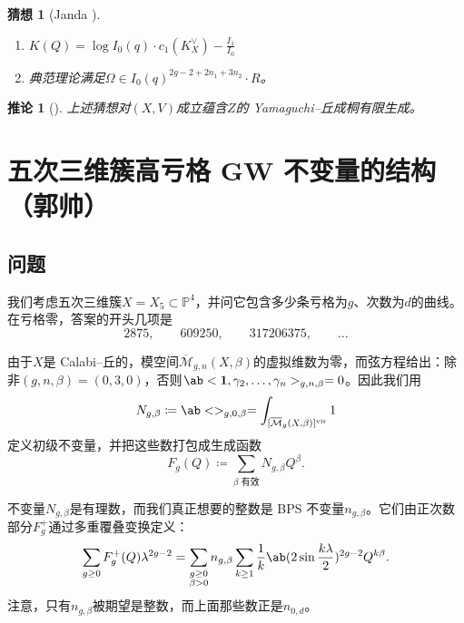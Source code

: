 \documentclass{amsart}
\newtheorem{cor}[thm]{推论}
\newtheorem{conj}[thm]{猜想}
\theoremstyle{definition}
\theoremstyle{remark}
\theoremstyle{plain}
\theoremstyle{definition}
\theoremstyle{remark}
\renewcommand{\P}{\mathbb{P}}
\newcommand{\Mbar}{\overline{\mathcal{M}}}
\newcommand{\mr}[1]{\mathrm{#1}}
\newcommand{\1}{\mathbf{1}}
\newcommand{\2}{\mathbf{2}}
\newcommand{\3}{\mathbf{3}}
\newcommand{\vir}{\mr{vir}}
\begin{document}
\begin{conj}[Janda {\cite[猜想~1.6]{CJRtropical2025}}]\leavevmode
    \begin{enumerate}
        \item \(K(Q) = \log I_0(q) \cdot c_1(K_X^{\vee}) - \frac{I_1}{I_0}\) \\
        \item 典范理论满足\(\Omega \in I_0(q)^{2g-2+2n_1 + 3 n_2} \cdot R\)。
    \end{enumerate}
\end{conj}

\begin{cor}[{\cite[定理~1.7]{CJRtropical2025}}]
    上述猜想对\((X, V)\)成立蕴含\(Z\)的 Yamaguchi--丘成桐有限生成。
\end{cor}


\section{五次三维簇高亏格 GW 不变量的结构（郭帅）}%
\label{sec:Structure of higher-genus GW invariants of the quintic (Shuai Guo)}

\subsection{问题}%
\label{sub:The problem (Guo)}

我们考虑五次三维簇\(X = X_5 \subset \P^4\)，并问它包含多少条亏格为\(g\)、次数为\(d\)的曲线。在亏格零，答案的开头几项是
\[ 2875, \qquad 609250, \qquad 317206375, \qquad \ldots \]

由于\(X\)是 Calabi--丘的，模空间\(\Mbar_{g,n}(X,\beta)\)的虚拟维数为零，而弦方程给出：除非\((g,n,\beta) = (0,3,0)\)，否则\(\ab<\1, \gamma_2, \ldots, \gamma_n>_{g,n,\beta} = 0\)。因此我们用
\[ N_{g,\beta} \coloneqq \ab<>_{g,0,\beta} = \int_{[\Mbar_g(X,\beta)]^{\vir}} 1 \]
定义初级不变量，并把这些数打包成生成函数
\[ F_g(Q) \coloneqq \sum_{\beta \text{ 有效}} N_{g,\beta}Q^{\beta}. \]

不变量\(N_{g,\beta}\)是有理数，而我们真正想要的整数是 BPS 不变量\(n_{g,\beta}\)。它们由正次数部分\(F_g^+\)通过多重覆叠变换定义：
\[ \sum_{g \geq 0} F_g^+(Q)\lambda^{2g-2} = \sum_{\substack{g \geq 0 \\ \beta > 0}} n_{g,\beta} \sum_{k \geq 1} \frac{1}{k} \ab(2 \sin \frac{k\lambda}{2})^{2g-2}Q^{k\beta}. \]
注意，只有\(n_{g,\beta}\)被期望是整数，而上面那些数正是\(n_{0,d}\)。
\end{document}
